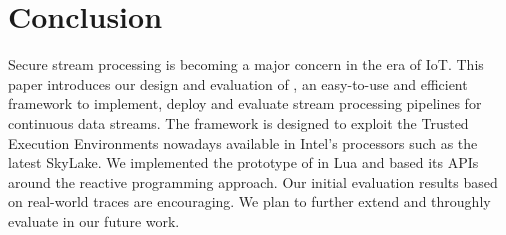 \section{Conclusion}
\label{sec:conclusion}
Secure stream processing is becoming a major concern in the era of IoT.
This paper introduces our design and evaluation of \SYS, an easy-to-use and efficient framework to implement, deploy and evaluate stream processing pipelines for continuous data streams.
The framework is designed to exploit the Trusted Execution Environments nowadays available in Intel's processors such as the latest SkyLake.
We implemented the prototype of \SYS in Lua and based its APIs around the reactive programming approach.
Our initial evaluation results based on real-world traces are encouraging.
We plan to further extend and throughly evaluate \SYS in our future work.
